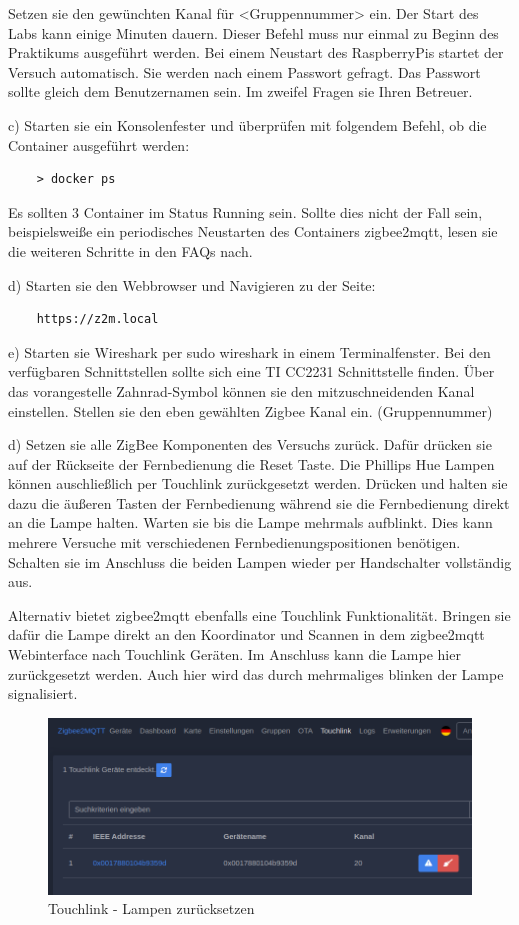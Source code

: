 Setzen sie den gewünchten Kanal für <Gruppennummer> ein. Der Start des Labs kann einige Minuten dauern. Dieser Befehl muss nur einmal zu Beginn
des Praktikums ausgeführt werden. Bei einem Neustart des RaspberryPis startet der Versuch automatisch. Sie werden nach einem Passwort gefragt. 
Das Passwort sollte gleich dem Benutzernamen sein. Im zweifel Fragen sie Ihren Betreuer.

c) Starten sie ein Konsolenfester und überprüfen mit folgendem Befehl, ob die Container ausgeführt werden:
\begin{lstlisting}
    > docker ps
\end{lstlisting}

Es sollten 3 Container im Status \grqq Running\grqq{} sein. Sollte dies nicht der Fall sein, beispielsweiße ein periodisches Neustarten des Containers 
\grqq zigbee2mqtt\grqq{}, lesen sie die weiteren Schritte in den FAQs nach.

d) Starten sie den Webbrowser und Navigieren zu der Seite:
\begin{lstlisting}
    https://z2m.local
\end{lstlisting}

e) Starten sie Wireshark per \grqq sudo wireshark\grqq{} in einem Terminalfenster. Bei den verfügbaren Schnittstellen sollte sich eine 
\grqq TI CC2231\grqq{} Schnittstelle finden. Über das vorangestelle Zahnrad-Symbol können sie den mitzuschneidenden
 Kanal einstellen. Stellen sie den eben gewählten Zigbee Kanal ein. (Gruppennummer)

d) Setzen sie alle ZigBee Komponenten des Versuchs zurück. Dafür drücken sie auf der Rückseite der Fernbedienung die Reset Taste.
Die Phillips Hue Lampen können auschließlich per Touchlink zurückgesetzt werden. Drücken und halten sie dazu die äußeren Tasten der Fernbedienung während sie die Fernbedienung
direkt an die Lampe halten. Warten sie bis die Lampe mehrmals aufblinkt. Dies kann mehrere Versuche mit verschiedenen Fernbedienungspositionen benötigen. Schalten sie im Anschluss
die beiden Lampen wieder per Handschalter vollständig aus.

Alternativ bietet zigbee2mqtt ebenfalls eine Touchlink Funktionalität. Bringen sie dafür die Lampe direkt an den Koordinator und Scannen in dem zigbee2mqtt Webinterface nach 
Touchlink Geräten. Im Anschluss kann die Lampe hier zurückgesetzt werden. Auch hier wird das durch mehrmaliges blinken der Lampe signalisiert.

\begin{figure}[H]
    \centering
    \includegraphics[width=1\textwidth]{media/z2m-touchlink.png}
    \caption{Touchlink - Lampen zurücksetzen}
\end{figure}

